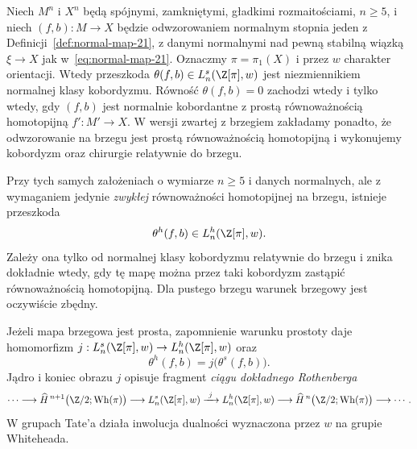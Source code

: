 \begin{twierdzenie}
\label{thm:Wall-L-22}
Niech $M^n$ i $X^n$ będą spójnymi, zamkniętymi,
gładkimi rozmaitościami, $n\geq5$, i niech
$(f,b):M\to X$ będzie odwzorowaniem normalnym
stopnia jeden z Definicji~\ref{def:normal-map-21},
z danymi normalnymi nad pewną stabilną wiązką
$\xi\to X$ jak w~\eqref{eq:normal-map-21}.
Oznaczmy $\pi=\pi_1(X)$ i przez $w$ charakter
orientacji. Wtedy przeszkoda
$\theta(f,b)\in L^s_n(\Z[\pi],w)$ jest niezmiennikiem
normalnej klasy kobordyzmu.
Równość $\theta(f,b)=0$ zachodzi wtedy i tylko wtedy,
gdy $(f,b)$ jest normalnie kobordantne z prostą
równoważnością homotopijną $f':M'\to X$.
W wersji zwartej z brzegiem zakładamy ponadto,
że odwzorowanie na brzegu jest prostą równoważnością
homotopijną i wykonujemy kobordyzm oraz chirurgie
relatywnie do brzegu.
\end{twierdzenie}

\begin{twierdzenie}\label{thm:Wall-h-22}
Przy tych samych założeniach o wymiarze $n\geq5$
i danych normalnych, ale z wymaganiem jedynie
\emph{zwykłej} równoważności homotopijnej na brzegu,
istnieje przeszkoda
\[
 \theta^h(f,b)\in L^h_n(\Z[\pi],w).
\]
Zależy ona tylko od normalnej klasy kobordyzmu
relatywnie do brzegu i znika dokładnie wtedy,
gdy tę mapę można przez taki kobordyzm zastąpić
równoważnością homotopijną. Dla pustego brzegu
warunek brzegowy jest oczywiście zbędny.

Jeżeli mapa brzegowa jest prosta, zapomnienie
warunku prostoty daje homomorfizm
$j:L^s_n(\Z[\pi],w)\to L^h_n(\Z[\pi],w)$ oraz
\[
 \theta^h(f,b)=j\bigl(\theta^s(f,b)\bigr).
\]
Jądro i koniec obrazu $j$ opisuje fragment
\emph{ciągu dokładnego Rothenberga}
\begin{equation}\label{eq:Rothenberg-sh-22}
 \cdots\longrightarrow
 \widehat H^{\,n+1}\bigl(\Z/2;\operatorname{Wh}(\pi)\bigr)
 \longrightarrow L^s_n(\Z[\pi],w)
 \xrightarrow{\ j\ } L^h_n(\Z[\pi],w)
 \longrightarrow
 \widehat H^{\,n}\bigl(\Z/2;\operatorname{Wh}(\pi)\bigr)
 \longrightarrow\cdots .
\end{equation}
W grupach Tate'a działa inwolucja dualności
wyznaczona przez $w$ na grupie Whiteheada.
\end{twierdzenie}

